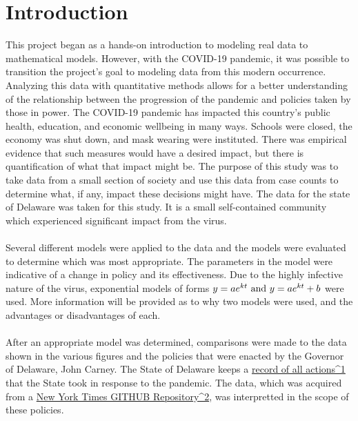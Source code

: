 \documentclass[12pt]{article}
\begin{document}
\pagebreak

\section{Introduction}
\praragraph{} This project began as a hands-on introduction to modeling real data to mathematical models. However, with the COVID-19 pandemic, it was possible to transition the project's goal to modeling data from this modern occurrence. Analyzing this data with quantitative methods allows for a better understanding of the relationship between the progression of the pandemic and policies taken by those in power. The COVID-19 pandemic has impacted this country’s public health, education, and economic wellbeing in many ways. Schools were closed, the economy was shut down, and mask wearing were instituted. There was empirical evidence that such measures would have a desired impact, but there is quantification of what that impact might be. The purpose of this study was to take data from a small section of society and use this data from case counts to determine what, if any, impact these decisions might have. The data for the state of Delaware was taken for this study. It is a small self-contained community which experienced significant impact from the virus.
\paragraph{} Several different models were applied to the data and the models were evaluated to determine which was most appropriate. The parameters in the model were indicative of a change in policy and its effectiveness. Due to the highly infective nature of the virus, exponential models of forms $y = ae^{kt} \textnormal{ and } y = ae^{kt} + b$ were used. More information will be provided as to why two models were used, and the advantages or disadvantages of each.
\paragraph{} After an appropriate model was determined, comparisons were made to the data shown in the various figures and the policies that were enacted by the Governor of Delaware, John Carney. The State of Delaware keeps a \href{https://governor.delaware.gov/health-soe/}{record of all actions^1} that the State took in response to the pandemic. The data, which was acquired from a \href{https://github.com/nytimes/covid-19-data/blob/master/us-states.csv}{New York Times GITHUB Repository^2}, was interpretted in the scope of these policies.
\end{document}
